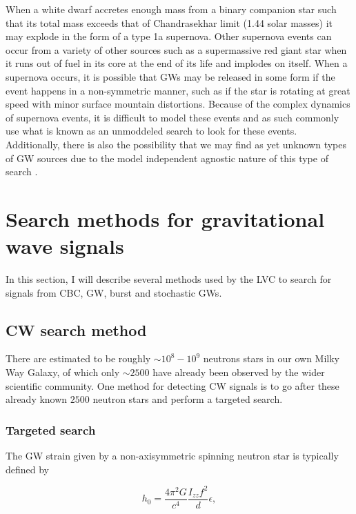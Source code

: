 When a white dwarf accretes enough mass from a binary companion star such that its total mass exceeds that of Chandrasekhar limit (1.44 solar masses) it may explode in the form of a type 1a supernova. Other supernova events can occur from a variety of other sources such as a supermassive red giant star when it runs out of fuel in its core at the end of its life and implodes on itself. When a supernova occurs, it is possible that \ac{GW}s may be released in some form if the event happens in a non-symmetric manner, such as if the star is rotating at great speed with minor surface mountain distortions. Because of the complex dynamics of supernova events, it is difficult to model these events and as such commonly use what is known as an unmoddeled search to look for these events. Additionally, there is also the possibility that we may find as yet unknown types of \ac{GW} sources due to the model independent agnostic nature of this type of search \cite{Sathyaprakash2009}. 

\section{Search methods for gravitational wave signals}

In this section, I will describe several methods used by the 
\ac{LVC} to search for signals from \ac{CBC}, \ac{GW}, burst and 
stochastic \ac{GW}s.

\subsection{\ac{CW} search method}

There are estimated to be roughly $\sim 10^{8} - 10^{9}$ neutrons stars 
in our own Milky Way Galaxy, of which only $\sim 2500$ have already 
been observed by the wider scientific community. One method for detecting 
\ac{CW} signals is to go after these already known $2500$ neutron 
stars and perform a targeted search.

\subsubsection{Targeted search}
The GW strain given by a non-axisymmetric spinning neutron star 
is typically defined by 

\begin{equation}
    h_{0} = \frac{4\pi^2G}{c^4} \frac{I_{zz} f^2}{d} \epsilon,
\end{equation}

